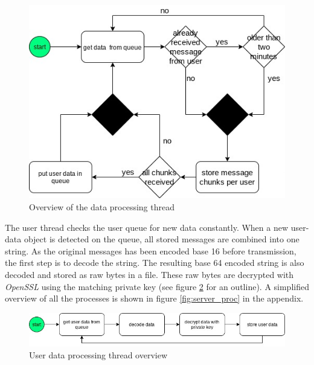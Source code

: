         \begin{figure}[h]
            \centering
            \includegraphics[width=\textwidth]{latex/figures/data_threat.jpg}
            \caption{Overview of the data processing thread}
            \label{fig:data_thread}
        \end{figure}
        
        The user thread checks the user queue for new data constantly. When a new user-data object is detected on the queue, all stored messages are combined into one string.
        As the original messages has been encoded base 16 before transmission, the first step is to decode the string. The resulting base 64 encoded string is also decoded and stored as raw bytes in a file. These raw bytes are decrypted with \textit{OpenSSL} using the matching private key (see figure \ref{fig:user_thread} for an outline). A simplified overview of all the processes is shown in figure \ref{fig:server_proc} in the appendix.\\
        
        \begin{figure}[h]
            \centering
            \includegraphics[width=\textwidth]{latex/figures/user_threat.jpg}
            \caption{User data processing thread overview}
            \label{fig:user_thread}
        \end{figure}

